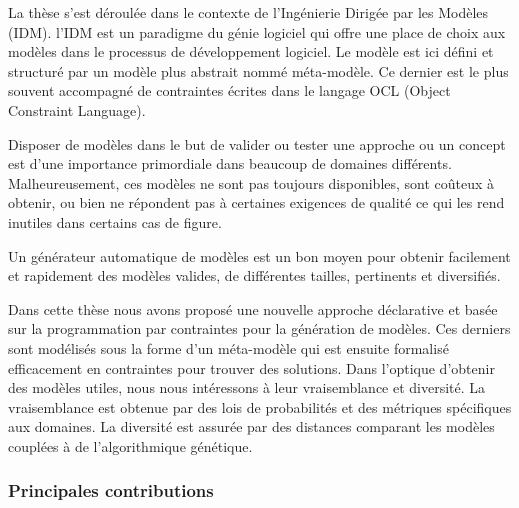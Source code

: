 La thèse s'est déroulée dans le contexte de l'Ingénierie Dirigée par les Modèles (IDM). l'IDM est un paradigme du génie logiciel qui offre une place de choix aux modèles dans le processus de développement logiciel. Le modèle est ici défini et structuré par un modèle plus abstrait nommé méta-modèle. Ce dernier est le plus souvent accompagné de contraintes écrites dans le langage OCL (Object Constraint Language).

Disposer de modèles dans le but de valider ou tester une approche ou un concept est d'une importance primordiale dans beaucoup de domaines différents. Malheureusement, ces modèles ne sont pas toujours disponibles, sont coûteux à obtenir, ou bien ne répondent pas à certaines exigences de qualité ce qui les rend inutiles dans certains cas de figure.

Un générateur automatique de modèles est un bon moyen pour obtenir facilement et rapidement des modèles valides, de différentes tailles, pertinents et diversifiés.

Dans cette thèse nous avons proposé une nouvelle approche déclarative et basée sur la programmation par contraintes pour la génération de modèles. Ces derniers sont modélisés sous la forme d'un méta-modèle qui est ensuite formalisé efficacement en contraintes pour trouver des solutions. Dans l'optique d'obtenir des modèles utiles, nous nous intéressons à leur vraisemblance et diversité. La vraisemblance est obtenue par des lois de probabilités et des métriques spécifiques aux domaines. La diversité est assurée par des distances comparant les modèles couplées à de l'algorithmique génétique.


\subsubsection*{Principales contributions}

